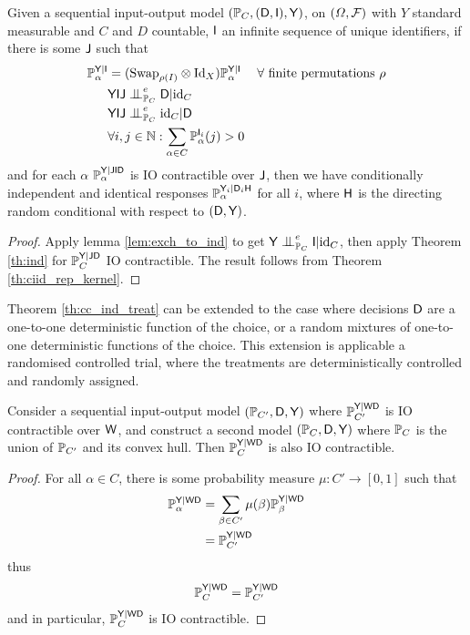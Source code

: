 \begin{theorem}\label{th:cc_ind_treat}
Given a sequential input-output model $(\mathbb{P}_C,(\mathsf{D},\mathsf{I}),\mathsf{Y})$, on $(\Omega,\mathcal{F})$ with $Y$ standard measurable and $C$ and $D$ countable, $\mathsf{I}$ an infinite sequence of unique identifiers, if there is some $\mathsf{J}$ such that
\begin{align}
    \prob{P}_\alpha^{\RV{Y}|\RV{I}} &= (\text{Swap}_{\rho(I)}\otimes \text{Id}_X )\prob{P}_\alpha^{\RV{Y}|\RV{I}}&\forall \text{ finite permutations }\rho\\
    &\RV{YIJ}\CI^e_{\prob{P}_C} \RV{D}|\text{id}_C\\
    &\RV{YIJ}\CI^e_{\prob{P}_C} \text{id}_C|\RV{D}\\
    &\forall i,j\in \mathbb{N}: \sum_{\alpha\in C} \prob{P}_\alpha^{\RV{I}_i}(j)>0
\end{align}
and for each $\alpha$ $\mathbb{P}_\alpha^{\mathsf{Y}|\mathsf{JID}}$ is IO contractible over $\mathsf{J}$, then we have conditionally independent and identical responses $\mathbb{P}_\alpha^{\mathsf{Y}_i|\mathsf{D}_i\mathsf{H}}$ for all $i$, where $\mathsf{H}$ is the directing random conditional with respect to $(\mathsf{D},\mathsf{Y})$.
\end{theorem}

\begin{proof}
Apply lemma \ref{lem:exch_to_ind} to get $\RV{Y}\CI^e_{\prob{P}_C} \RV{I} | \text{id}_C$, then apply Theorem \ref{th:ind} for $\mathbb{P}_C^{\mathsf{Y}|\mathsf{J}\mathsf{D}}$ IO contractible. The result follows from Theorem \ref{th:ciid_rep_kernel}.
\end{proof}

Theorem \ref{th:cc_ind_treat} can be extended to the case where decisions $\mathsf{D}$ are a one-to-one deterministic function of the choice, or a random mixtures of one-to-one deterministic functions of the choice. This extension is applicable a randomised controlled trial, where the treatments are deterministically controlled and randomly assigned.

\begin{theorem}\label{cor:extend_to_randomised}
Consider a sequential input-output model $(\mathbb{P}_{C'},\mathsf{D},\mathsf{Y})$ where $\mathbb{P}_{C'}^{\mathsf{Y}|\mathsf{WD}}$ is IO contractible over $\mathsf{W}$, and construct a second model $(\mathbb{P}_{C},\mathsf{D},\mathsf{Y})$ where $\mathbb{P}_C$ is the union of $\mathbb{P}_{C'}$ and its convex hull. Then $\mathbb{P}_{C}^{\mathsf{Y}|\mathsf{WD}}$ is also IO contractible.
\end{theorem}

\begin{proof}
For all $\alpha\in C$, there is some probability measure $\mu:C'\to [0,1]$ such that
\begin{align}
    \mathbb{P}_\alpha^{\mathsf{Y}|\mathsf{WD}} &= \sum_{\beta\in C'} \mu(\beta) \mathbb{P}_\beta^{\mathsf{Y}|\mathsf{WD}}\\
    &= \mathbb{P}_{C'}^{\mathsf{Y}|\mathsf{WD}}
\end{align}
thus
\begin{align}
    \mathbb{P}_C^{\mathsf{Y}|\mathsf{WD}} = \mathbb{P}_{C'}^{\mathsf{Y}|\mathsf{WD}}
\end{align}
and in particular, $\mathbb{P}_C^{\mathsf{Y}|\mathsf{WD}}$ is IO contractible.
\end{proof}

